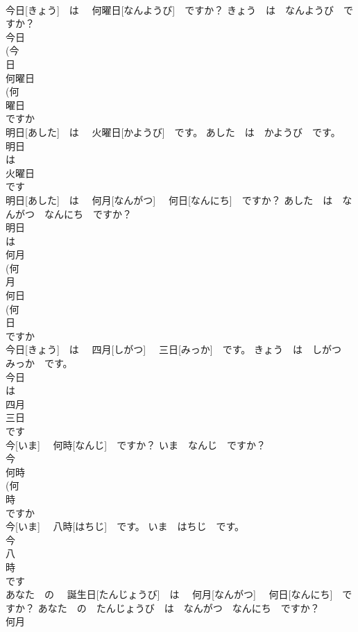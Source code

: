 \documentclass[8pt]{extreport}
\begin{document}
\begin{CJK}{UTF8}{min}
\\	今日[きょう]　は　 何曜日[なんようび]　ですか？	きょう　は　なんようび　ですか？	
\\	今日 
\\	(今 
\\	日 
\\	何曜日 
\\	(何 
\\	曜日 
\\	ですか 
\\	明日[あした]　は 　火曜日[かようび]　です。	あした　は　かようび　です。	
\\	明日 
\\	は 
\\	火曜日 
\\	です 
\\	明日[あした]　は　 何月[なんがつ]　 何日[なんにち]　ですか？	あした　は　なんがつ　なんにち　ですか？	
\\	明日 
\\	は 
\\	何月 
\\	(何 
\\	月 
\\	何日 
\\	(何 
\\	日 
\\	ですか 
\\	今日[きょう]　は 　四月[しがつ]　 三日[みっか]　です。	きょう　は　しがつ　みっか　です。	
\\	今日 
\\	は 
\\	四月 
\\	三日 
\\	です 
\\	今[いま]　 何時[なんじ]　ですか？	いま　なんじ　ですか？	
\\	今 
\\	何時 
\\	(何 
\\	時 
\\	ですか 
\\	今[いま]　 八時[はちじ]　です。	いま　はちじ　です。	
\\	今 
\\	八 
\\	時 
\\	です 
\\	あなた　の 　誕生日[たんじょうび]　は 　何月[なんがつ]　 何日[なんにち]　ですか？	あなた　の　たんじょうび　は　なんがつ　なんにち　ですか？	
\\	何月 

\end{CJK}
\end{document}
